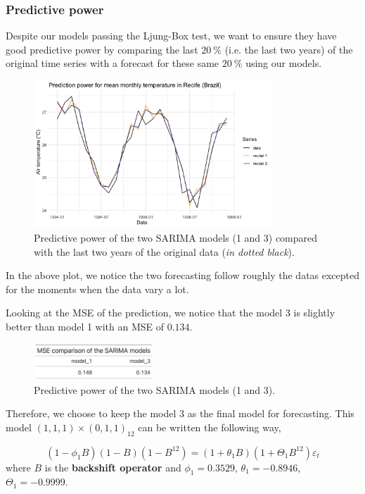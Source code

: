 \subsubsection{Predictive power}

Despite our models passing the Ljung-Box test, we want to ensure they have good predictive power by comparing the last $\SI{20}{\percent}$ (i.e. the last two years) of the original time series with a forecast for these same $\SI{20}{\percent}$ using our models.

\begin{figure}[H]
	\centering
	\includegraphics[width=0.8\textwidth]{figures/box_jenkins/predictive_power.png}
	\caption{Predictive power of the two SARIMA models (1 and 3) compared with the last two years of the original data (\textit{in dotted black}).}
	\label{fig:predictive-power}
\end{figure}

In the above plot, we notice the two forecasting follow roughly the datas excepted for the moments when the data vary a lot.

Looking at the MSE of the prediction, we notice that the model 3 is slightly better than model 1 with an MSE of $0.134$.
\begin{figure}[H]
	\centering
	\includegraphics[width=0.4\textwidth]{figures/box_jenkins/predictive_power_mse.png}
	\caption{Predictive power of the two SARIMA models (1 and 3).}
	\label{fig:predictive-power-mse}
\end{figure}

Therefore, we choose to keep the model $3$ as the final model for forecasting. This model $(1, 1, 1) \times (0, 1, 1)_{12}$ can be written the following way,

\begin{equation} \label{eq:final-model}
	(1 - \phi_1 B)(1 - B)(1 - B^{12}) = (1 + \theta_1 B)(1 + \Theta_1 B^{12}) \varepsilon_t
\end{equation}
where $B$ is the \textbf{backshift operator} and $\phi_1 = 0.3529$, $\theta_1 = -0.8946$, $\Theta_1 = -0.9999$.